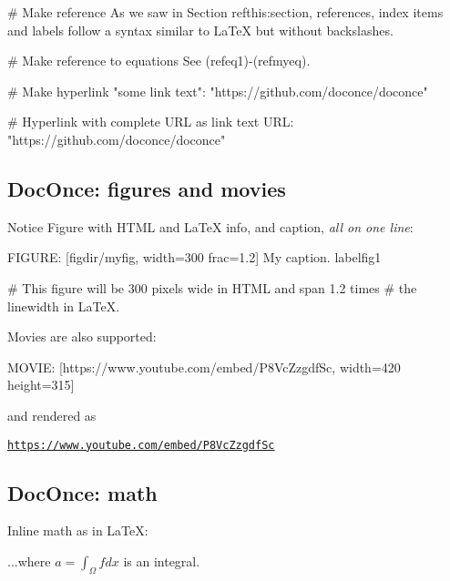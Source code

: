 \documentclass[%
oneside,                 %
final,                   %
10pt]{article}
\newenvironment{doconce:movie}{}{}
\newcounter{doconce:movie:counter}
\begin{document}
# Make reference
As we saw in Section ref{this:section}, references, index
items and labels follow a syntax similar to LaTeX
but without backslashes.

# Make reference to equations
See (ref{eq1})-(ref{myeq}).

# Make hyperlink
"some link text": "https://github.com/doconce/doconce"

# Hyperlink with complete URL as link text
URL: "https://github.com/doconce/doconce"

\edo


\subsection{DocOnce: figures and movies}

\begin{block}{Notice}
Figure with HTML and {\LaTeX} info, and caption, \emph{all on one line}:
\end{block}






\bccq
FIGURE: [figdir/myfig, width=300 frac=1.2] My caption. label{fig1}

# This figure will be 300 pixels wide in HTML and span 1.2 times
# the linewidth in LaTeX.

\eccq


Movies are also supported:



\bccq
MOVIE: [https://www.youtube.com/embed/P8VcZzgdfSc, width=420 height=315]

\eccq

and rendered as


\begin{doconce:movie}
\begin{center}
\href{{https://www.youtube.com/embed/P8VcZzgdfSc}}{\nolinkurl{https://www.youtube.com/embed/P8VcZzgdfSc}}
\end{center}
\end{doconce:movie}


\subsection{DocOnce: math}

Inline math as in {\LaTeX}:



\bccq
...where $a=\int_{\Omega}fdx$ is an integral.
\end{document}
